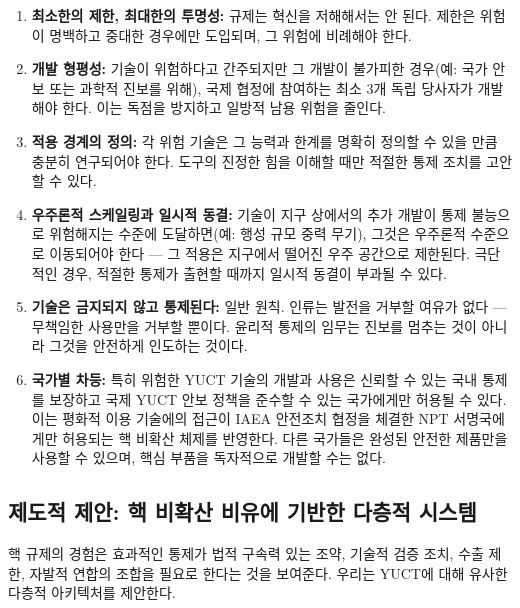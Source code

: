 \documentclass[12pt,a4paper]{article}
\theoremstyle{remark}
\begin{document}
	\begin{enumerate}[leftmargin=*]
		\item \textbf{최소한의 제한, 최대한의 투명성:} 규제는 혁신을 저해해서는 안 된다. 제한은 위험이 명백하고 중대한 경우에만 도입되며, 그 위험에 비례해야 한다.
		
		\item \textbf{개발 형평성:} 기술이 위험하다고 간주되지만 그 개발이 불가피한 경우(예: 국가 안보 또는 과학적 진보를 위해), 국제 협정에 참여하는 최소 3개 독립 당사자가 개발해야 한다. 이는 독점을 방지하고 일방적 남용 위험을 줄인다.
		
		\item \textbf{적용 경계의 정의:} 각 위험 기술은 그 능력과 한계를 명확히 정의할 수 있을 만큼 충분히 연구되어야 한다. 도구의 진정한 힘을 이해할 때만 적절한 통제 조치를 고안할 수 있다.
		
		\item \textbf{우주론적 스케일링과 일시적 동결:} 기술이 지구 상에서의 추가 개발이 통제 불능으로 위험해지는 수준에 도달하면(예: 행성 규모 중력 무기), 그것은 우주론적 수준으로 이동되어야 한다 — 그 적용은 지구에서 떨어진 우주 공간으로 제한된다. 극단적인 경우, 적절한 통제가 출현할 때까지 일시적 동결이 부과될 수 있다.
		
		\item \textbf{기술은 금지되지 않고 통제된다:} 일반 원칙. 인류는 발전을 거부할 여유가 없다 — 무책임한 사용만을 거부할 뿐이다. 윤리적 통제의 임무는 진보를 멈추는 것이 아니라 그것을 안전하게 인도하는 것이다.
		
		\item \textbf{국가별 차등:} 특히 위험한 YUCT 기술의 개발과 사용은 신뢰할 수 있는 국내 통제를 보장하고 국제 YUCT 안보 정책을 준수할 수 있는 국가에게만 허용될 수 있다. 이는 평화적 이용 기술에의 접근이 IAEA 안전조치 협정을 체결한 NPT 서명국에게만 허용되는 핵 비확산 체제를 반영한다. 다른 국가들은 완성된 안전한 제품만을 사용할 수 있으며, 핵심 부품을 독자적으로 개발할 수는 없다.
	\end{enumerate}
	
	\subsection{제도적 제안: 핵 비확산 비유에 기반한 다층적 시스템}
	\label{subsec:institutions}
	
	핵 규제의 경험은 효과적인 통제가 법적 구속력 있는 조약, 기술적 검증 조치, 수출 제한, 자발적 연합의 조합을 필요로 한다는 것을 보여준다. 우리는 YUCT에 대해 유사한 다층적 아키텍처를 제안한다.
	
\end{document}
